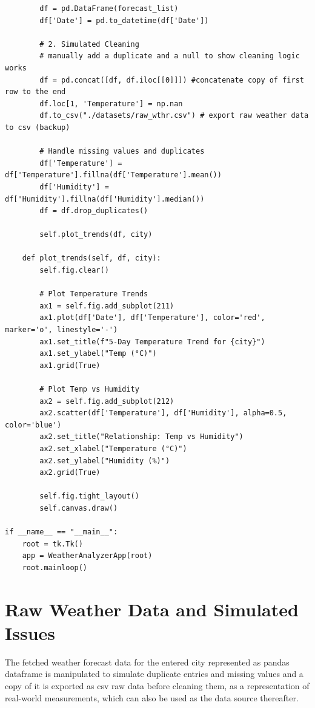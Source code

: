 \documentclass[a4paper]{article}
\begin{document}
\begin{verbatim}
        df = pd.DataFrame(forecast_list)
        df['Date'] = pd.to_datetime(df['Date'])

        # 2. Simulated Cleaning
        # manually add a duplicate and a null to show cleaning logic works
        df = pd.concat([df, df.iloc[[0]]]) #concatenate copy of first row to the end
        df.loc[1, 'Temperature'] = np.nan
        df.to_csv("./datasets/raw_wthr.csv") # export raw weather data to csv (backup)
        
        # Handle missing values and duplicates
        df['Temperature'] = df['Temperature'].fillna(df['Temperature'].mean())
        df['Humidity'] = df['Humidity'].fillna(df['Humidity'].median())
        df = df.drop_duplicates()

        self.plot_trends(df, city)

    def plot_trends(self, df, city):
        self.fig.clear()
        
        # Plot Temperature Trends
        ax1 = self.fig.add_subplot(211)
        ax1.plot(df['Date'], df['Temperature'], color='red', marker='o', linestyle='-')
        ax1.set_title(f"5-Day Temperature Trend for {city}")
        ax1.set_ylabel("Temp (°C)")
        ax1.grid(True)

        # Plot Temp vs Humidity
        ax2 = self.fig.add_subplot(212)
        ax2.scatter(df['Temperature'], df['Humidity'], alpha=0.5, color='blue')
        ax2.set_title("Relationship: Temp vs Humidity")
        ax2.set_xlabel("Temperature (°C)")
        ax2.set_ylabel("Humidity (%)")
        ax2.grid(True)

        self.fig.tight_layout()
        self.canvas.draw()

if __name__ == "__main__":
    root = tk.Tk()
    app = WeatherAnalyzerApp(root)
    root.mainloop()
\end{verbatim}

\vspace{20pt}

\section*{Raw Weather Data and Simulated Issues}

The fetched weather forecast data for the entered city represented as pandas dataframe is manipulated to 
simulate duplicate entries and missing values and a copy of it is exported as csv raw data before cleaning them, as a representation of real-world measurements, which can also be used as the data source thereafter.
\end{document}
